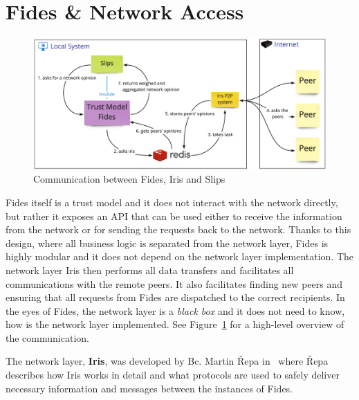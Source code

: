 \section{Fides \& Network Access}
\label{sec:fides-and-network-access}

\begin{figure}[ht]
    \centering
    \includegraphics[width=1.0\textwidth]{assets/communication_architecture.jpeg}
    \caption{Communication between Fides, Iris and Slips}
    \label{fig:fides-api-network}
\end{figure}

Fides itself is a trust model and it does not interact with the network directly, but rather it exposes an API that can be used either to receive the information from the network or for sending the requests back to the network.
Thanks to this design, where all business logic is separated from the network layer, Fides is highly modular and it does not depend on the network layer implementation.
The network layer Iris then performs all data transfers and facilitates all communications with the remote peers.
It also facilitates finding new peers and ensuring that all requests from Fides are dispatched to the correct recipients.
In the eyes of Fides, the network layer is a \textit{black box} and it does not need to know, how is the network layer implemented.
See Figure~\ref{fig:fides-api-network} for a high-level overview of the communication.

The network layer, \textbf{Iris}, was developed by Bc. Martin Řepa in~\cite{nl} where Řepa describes how Iris works in detail and what protocols are used to safely deliver necessary information and messages between the instances of Fides.